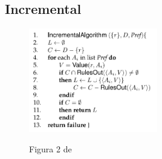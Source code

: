 \subsection{Incremental}

\begin{figure}[ht]
\includegraphics[width=0.5\textwidth]{images/algoritmoIncremental.png}
\label{algoritmoIncremental}
\caption{Figura 2 de \protect\cite{survey}}
\end{figure}


